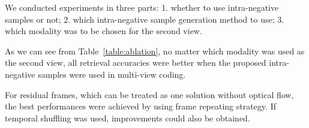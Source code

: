 \documentclass[sigconf]{acmart}
\begin{document}
We conducted experiments in three parts: 1. whether to use intra-negative samples or not; 2. which intra-negative sample generation method to use; 3. which modality was to be chosen for the second view. 

\begin{table}[tb]
\centering
  \caption{Ablation studies on different option configurations. The best performances are in \textbf{bold} for each \textit{modality}. Note that RGB video clips are fixed for view 1 and the modalities here represent only for view 2.}
  \label{table:ablation}
\end{table}

As we can see from Table~\ref{table:ablation}, no matter which modality was used as the second view, all retrieval accuracies were better when the proposed intra-negative samples were used in multi-view coding. 

For residual frames, which can be treated as one solution without optical flow, the best performances were achieved by using frame repeating strategy. If temporal shuffling was used, improvements could also be obtained.
\end{document}
